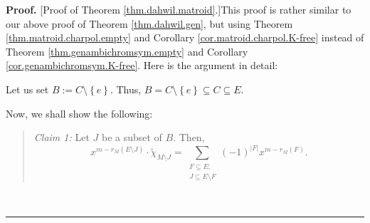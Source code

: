 \documentclass[numbers=enddot,12pt,final,onecolumn,notitlepage]{scrartcl}%
\theoremstyle{definition}
\newenvironment{statement}{\begin{quote}}{\end{quote}}
\newenvironment{proof}[1][Proof]{\noindent\textbf{#1.} }{\ \rule{0.5em}{0.5em}}
\newenvironment{verlong}{}{}
\let\sumnonlimits\sum
\renewcommand{\sum}{\sumnonlimits\limits}
\begin{document}
\begin{verlong}
\begin{proof}
[Proof of Theorem \ref{thm.dahwil.matroid}.]This proof is rather similar to
our above proof of Theorem \ref{thm.dahwil.gen}, but using Theorem
\ref{thm.matroid.charpol.empty} and Corollary \ref{cor.matroid.charpol.K-free}
instead of Theorem \ref{thm.genambichromsym.empty} and Corollary
\ref{cor.genambichromsym.K-free}. Here is the argument in detail:

Let us set $B:=C\setminus\left\{  e\right\}  $. Thus, $B=C\setminus\left\{
e\right\}  \subseteq C\subseteq E$.

Now, we shall show the following:

\begin{statement}
\textit{Claim 1:} Let $J$ be a subset of $B$. Then,%
\[
x^{m-r_{M}\left(  E\setminus J\right)  }\cdot\widetilde{\chi}_{M\setminus
J}=\sum_{\substack{F\subseteq E;\\J\subseteq E\setminus F}}\left(  -1\right)
^{\left\vert F\right\vert }x^{m-r_{M}\left(  F\right)  }.
\]

\end{statement}


\end{proof}
\end{verlong}
\end{document}
